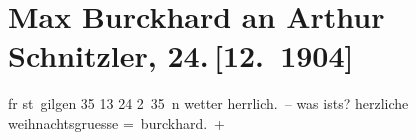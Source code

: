

         
         \renewcommand{\erwaehntePersonen}{Personen: Max Eugen Burckhard, Karoline Neuberger}
         \renewcommand{\erwaehnteOrte}{Orte: St. Gilgen, Wien}
         \renewcommand{\erwaehnteWerke}{}
               \section[Max Burckhard an Arthur Schnitzler, 24. {[}12. 1904{]}]{ Max Burckhard an Arthur Schnitzler, 24. {[}12. 1904{]}}\nopagebreak{}\rehead{ }\begin{ledgroupsized}[t]{13cm}\normalsize\beginnumbering \toendnotes[C]{\smallbreak\pagebreak[2]} 
\pstart
           {\pb}fr st gilgen 35 13 24{ }2 35 n\pend
           \pstart
           wetter herrlich. – was ists? herzliche weihnachtsgruesse\pend
           \pstart \spacefill\mbox{= burckhard. +}\pend{}
         
         \endnumbering{}\end{ledgroupsized}  \newcommand{\dateiname}{L01482}\newcommand{\titel}{Max Burckhard an Arthur Schnitzler, 24. [12. 1904]}\newcommand{\editorInnen}{Martin Anton Müller und Gerd-Hermann Susen}
      